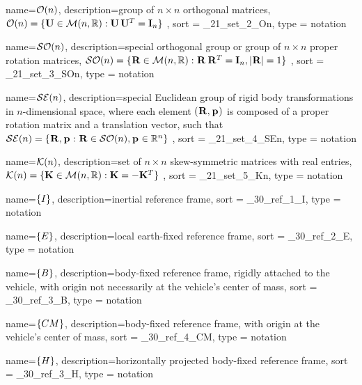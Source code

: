 {
  name={\ensuremath{\orth{n}}},
  description={group of $n \times n$ orthogonal matrices, 
                $\mathcal{O}(n) = \{\mathbf{U} \in \mathcal{M}(n,\mathbb{R}): \mathbf{U}\,\mathbf{U}^T = \mathbf{I}_{n}\}$ },
  sort = _21_set_2_On,
  type = notation
}

{
  name={\ensuremath{\so{n}}},
  description={special orthogonal group or group of $n \times n$ proper rotation matrices, 
                $\mathcal{SO}(n) = \{{}^{\scriptscriptstyle }_{\scriptscriptstyle }\mathbf{R} \in \mathcal{M}(n,\mathbb{R}): {}^{\scriptscriptstyle }_{\scriptscriptstyle }\mathbf{R}\,{}^{\scriptscriptstyle }_{\scriptscriptstyle }\mathbf{R}^T = \mathbf{I}_{n}, \left|{}^{\scriptscriptstyle }_{\scriptscriptstyle }\mathbf{R}\right| = 1\}$ },
  sort = _21_set_3_SOn,
  type = notation
}

{
  name={\ensuremath{\se{n}}},
  description={special Euclidean group of rigid body transformations in 
                $n$-dimensional space, where each element $({}^{\scriptscriptstyle }_{\scriptscriptstyle }\mathbf{R},{}^{\scriptscriptstyle }\mathbf{p}_{\scriptscriptstyle })$ 
                is composed of a proper rotation matrix and a translation vector, 
                such that 
                $\mathcal{SE}(n) = \{{}^{\scriptscriptstyle }_{\scriptscriptstyle }\mathbf{R},{}^{\scriptscriptstyle }\mathbf{p}_{\scriptscriptstyle }: {}^{\scriptscriptstyle }_{\scriptscriptstyle }\mathbf{R} \in \mathcal{SO}(n), {}^{\scriptscriptstyle }\mathbf{p}_{\scriptscriptstyle } \in \mathbb{R}^n\}$ },
  sort = _21_set_4_SEn,
  type = notation
}

{
  name={\ensuremath{\kr{n}}},
  description={set of $n \times n$ skew-symmetric matrices with real entries, 
                $\mathcal{K}(n) = \{\mathbf{K} \in \mathcal{M}(n,\mathbb{R}): \mathbf{K} = -\mathbf{K}^T\}$ },
  sort = _21_set_5_Kn,
  type = notation
}


{
  name={\ensuremath{\frameI}},
  description={inertial reference frame},
  sort = _30_ref_1_I,
  type = notation
}

{
  name={\ensuremath{\frameE}},
  description={local earth-fixed reference frame},
  sort = _30_ref_2_E,
  type = notation
}

{
  name={\ensuremath{\frameB}},
  description={body-fixed reference frame, rigidly attached to the vehicle, with origin not necessarily at the vehicle's center of mass},
  sort = _30_ref_3_B,
  type = notation
}

{
  name={\ensuremath{\frameCM}},
  description={body-fixed reference frame, with origin at the vehicle's center of mass},
  sort = _30_ref_4_CM,
  type = notation
}

{
  name={\ensuremath{\frameH}},
  description={horizontally projected body-fixed reference frame},
  sort = _30_ref_3_H,
  type = notation
}

